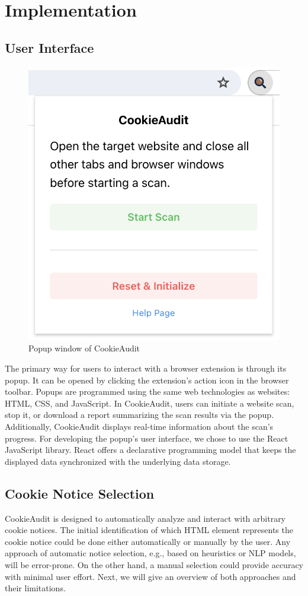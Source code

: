 \chapter{Implementation} \label{ch:implementation}

\section{User Interface}
\begin{figure}
	\centering
	\includegraphics[width=0.5\linewidth]{screenshot_popup.png}
	\caption{Popup window of CookieAudit}
	\label{fig:screenshot-popup}
\end{figure}
The primary way for users to interact with a browser extension is through its popup.
It can be opened by clicking the extension's action icon in the browser toolbar.
Popups are programmed using the same web technologies as websites: HTML, CSS, and JavaScript.
In CookieAudit, users can initiate a website scan, stop it, or download a report summarizing the scan results via the popup.
Additionally, CookieAudit displays real-time information about the scan's progress.
For developing the popup's user interface, we chose to use the React JavaScript library.
React offers a declarative programming model that keeps the displayed data synchronized with the underlying data storage.

\section{Cookie Notice Selection}
CookieAudit is designed to automatically analyze and interact with arbitrary cookie notices. 
The initial identification of which HTML element represents the cookie notice could be done either automatically or manually by the user.
Any approach of automatic notice selection, e.g., based on heuristics or NLP models, will be error-prone.
On the other hand, a manual selection could provide accuracy with minimal user effort.
Next, we will give an overview of both approaches and their limitations.

